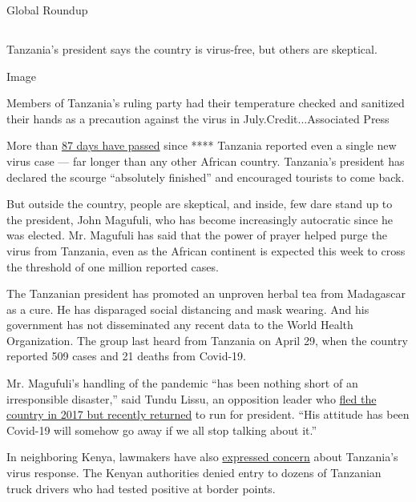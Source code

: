 Global Roundup

\hypertarget{-7}{%
\subsection{}\label{-7}}

Tanzania's president says the country is virus-free, but others are
skeptical.

Image

Members of Tanzania's ruling party had their temperature checked and
sanitized their hands as a precaution against the virus in
July.Credit...Associated Press

More than
\href{https://www.who.int/docs/default-source/coronaviruse/situation-reports/20200803-covid-19-sitrep-196-cleared.pdf?sfvrsn=8a8a3ca4_6}{87
days have passed} since **** Tanzania reported even a single new virus
case --- far longer than any other African country. Tanzania's president
has declared the scourge ``absolutely finished'' and encouraged tourists
to come back.

But outside the country, people are skeptical, and inside, few dare
stand up to the president, John Magufuli, who has become increasingly
autocratic since he was elected. Mr. Magufuli has said that the power of
prayer helped purge the virus from Tanzania, even as the African
continent is expected this week to cross the threshold of one million
reported cases.

The Tanzanian president has promoted an unproven herbal tea from
Madagascar as a cure. He has disparaged social distancing and mask
wearing. And his government has not disseminated any recent data to the
World Health Organization. The group last heard from Tanzania on April
29, when the country reported 509 cases and 21 deaths from Covid-19.

Mr. Magufuli's handling of the pandemic ``has been nothing short of an
irresponsible disaster,'' said Tundu Lissu, an opposition leader who
\href{https://www.nytimes3xbfgragh.onion/aponline/2020/07/27/world/africa/ap-af-tanzania-opposition-leader-returns.html}{fled
the country in 2017 but recently returned} to run for president. ``His
attitude has been Covid-19 will somehow go away if we all stop talking
about it.''

In neighboring Kenya, lawmakers have also
\href{https://www.youtube.com/watch?v=K1PeaFeAxGM}{expressed concern}
about Tanzania's virus response. The Kenyan authorities denied entry to
dozens of Tanzanian truck drivers who had tested positive at border
points.

